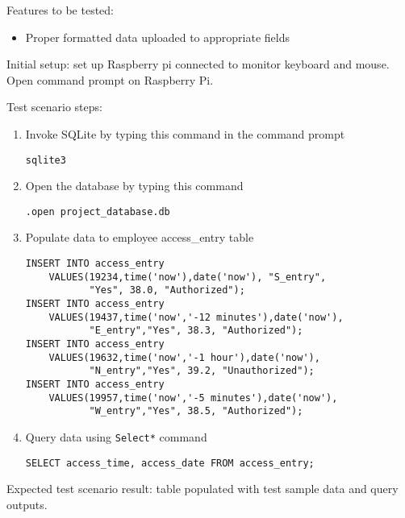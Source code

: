 \noindent
Features to be tested:
\begin{itemize}
    \item Proper formatted data uploaded to appropriate fields
\end{itemize}

\noindent
Initial setup: set up Raspberry pi connected to monitor keyboard and mouse.
Open command prompt on Raspberry Pi.

\noindent
Test scenario steps:
\begin{enumerate}
    \item Invoke SQLite by typing this command in the command prompt
\begin{listing}[H]
\begin{verbatim}
sqlite3
\end{verbatim}
\end{listing}
    \item Open the database by typing this command
\begin{listing}[H]
\begin{verbatim}
.open project_database.db
\end{verbatim}
\end{listing}
    \item Populate data to employee access\_entry table
\begin{listing}[H]
\begin{verbatim}
INSERT INTO access_entry
    VALUES(19234,time('now'),date('now'), "S_entry",
           "Yes", 38.0, "Authorized");
INSERT INTO access_entry
    VALUES(19437,time('now','-12 minutes'),date('now'),
           "E_entry","Yes", 38.3, "Authorized");
INSERT INTO access_entry
    VALUES(19632,time('now','-1 hour'),date('now'),
           "N_entry","Yes", 39.2, "Unauthorized");
INSERT INTO access_entry
    VALUES(19957,time('now','-5 minutes'),date('now'),
           "W_entry","Yes", 38.5, "Authorized");
\end{verbatim}
\end{listing}
    \item Query data using \lstinline{Select*} command
\begin{listing}[H]
\begin{verbatim}
SELECT access_time, access_date FROM access_entry;
\end{verbatim}
\end{listing}
\end{enumerate}

\noindent
Expected test scenario result: table populated with test sample data and query
outputs.

